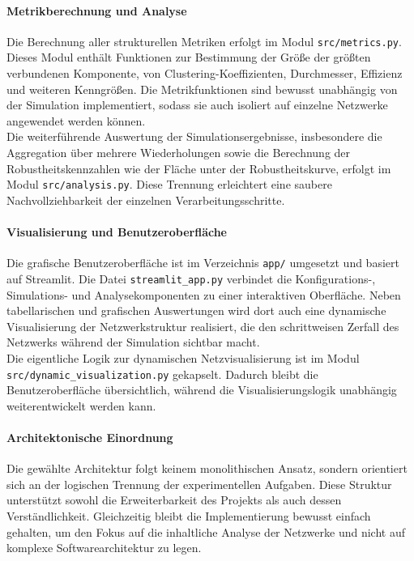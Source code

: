 \documentclass[12pt,a4paper]{article}
\begin{document}
\paragraph{Metrikberechnung und Analyse}
Die Berechnung aller strukturellen Metriken erfolgt im Modul
\texttt{src/metrics.py}. Dieses Modul enthält Funktionen zur Bestimmung der
Größe der größten verbundenen Komponente, von Clustering-Koeffizienten,
Durchmesser, Effizienz und weiteren Kenngrößen. Die Metrikfunktionen sind
bewusst unabhängig von der Simulation implementiert, sodass sie auch isoliert
auf einzelne Netzwerke angewendet werden können.\\
Die weiterführende Auswertung der Simulationsergebnisse, insbesondere die
Aggregation über mehrere Wiederholungen sowie die Berechnung der
Robustheitskennzahlen wie der Fläche unter der Robustheitskurve, erfolgt im
Modul \texttt{src/analysis.py}. Diese Trennung erleichtert eine saubere
Nachvollziehbarkeit der einzelnen Verarbeitungsschritte.

\paragraph{Visualisierung und Benutzeroberfläche}
Die grafische Benutzeroberfläche ist im Verzeichnis \texttt{app/} umgesetzt und
basiert auf Streamlit. Die Datei \texttt{streamlit\_app.py} verbindet die
Konfigurations-, Simulations- und Analysekomponenten zu einer interaktiven
Oberfläche. Neben tabellarischen und grafischen Auswertungen wird dort auch
eine dynamische Visualisierung der Netzwerkstruktur realisiert, die den
schrittweisen Zerfall des Netzwerks während der Simulation sichtbar macht.\\
Die eigentliche Logik zur dynamischen Netzvisualisierung ist im Modul \\
\texttt{src/dynamic\_visualization.py} gekapselt. Dadurch bleibt die
Benutzeroberfläche übersichtlich, während die Visualisierungslogik unabhängig
weiterentwickelt werden kann.

\paragraph{Architektonische Einordnung}
Die gewählte Architektur folgt keinem monolithischen Ansatz, sondern
orientiert sich an der logischen Trennung der experimentellen Aufgaben. Diese
Struktur unterstützt sowohl die Erweiterbarkeit des Projekts als auch dessen
Verständlichkeit. Gleichzeitig bleibt die Implementierung bewusst einfach
gehalten, um den Fokus auf die inhaltliche Analyse der Netzwerke und nicht auf
komplexe Softwarearchitektur zu legen.
\end{document}
